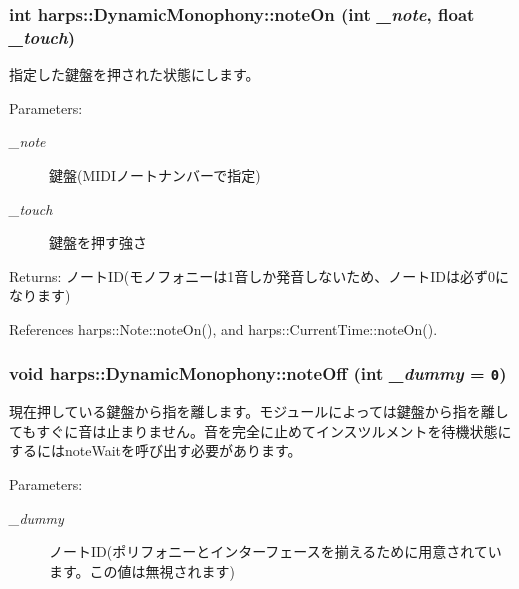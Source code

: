 \subsubsection[noteOn]{\setlength{\rightskip}{0pt plus 5cm}int harps::DynamicMonophony::noteOn (int {\em \_\-note}, \/  float {\em \_\-touch})\hspace{0.3cm}{\tt  [inline]}}\label{classharps_1_1DynamicMonophony_183d62c092e5903c0e60b5ded5670290}


指定した鍵盤を押された状態にします。 \begin{Desc}
\item[Parameters:]
\begin{description}
\item[{\em \_\-note}]鍵盤(MIDIノートナンバーで指定) \item[{\em \_\-touch}]鍵盤を押す強さ \end{description}
\end{Desc}
\begin{Desc}
\item[Returns:]ノートID(モノフォニーは1音しか発音しないため、ノートIDは必ず0になります) \end{Desc}


References harps::Note::noteOn(), and harps::CurrentTime::noteOn().
\subsubsection[noteOff]{\setlength{\rightskip}{0pt plus 5cm}void harps::DynamicMonophony::noteOff (int {\em \_\-dummy} = {\tt 0})\hspace{0.3cm}{\tt  [inline]}}\label{classharps_1_1DynamicMonophony_46144634cfb0eefe21660fdf5ac3baef}


現在押している鍵盤から指を離します。モジュールによっては鍵盤から指を離してもすぐに音は止まりません。音を完全に止めてインスツルメントを待機状態にするにはnoteWaitを呼び出す必要があります。 \begin{Desc}
\item[Parameters:]
\begin{description}
\item[{\em \_\-dummy}]ノートID(ポリフォニーとインターフェースを揃えるために用意されています。この値は無視されます) \end{description}
\end{Desc}


